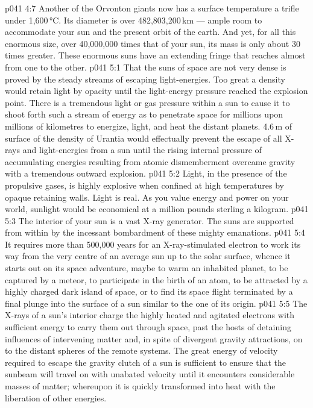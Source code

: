 \vs p041 4:7 Another of the Orvonton giants now has a surface temperature a trifle under 1,600\,°C. Its diameter is over 482,803,200\,km --- ample room to accommodate your sun and the present orbit of the earth. And yet, for all this enormous size, over 40,000,000 times that of your sun, its mass is only about 30 times greater. These enormous suns have an extending fringe that reaches almost from one to the other.
\vs p041 5:1 That the suns of space are not very dense is proved by the steady streams of escaping light\hyp{}energies. Too great a density would retain light by opacity until the light\hyp{}energy pressure reached the explosion point. There is a tremendous light or gas pressure within a sun to cause it to shoot forth such a stream of energy as to penetrate space for millions upon millions of kilometres to energize, light, and heat the distant planets. 4.6\,m of surface of the density of Urantia would effectually prevent the escape of all X\hyp{}rays and light\hyp{}energies from a sun until the rising internal pressure of accumulating energies resulting from atomic dismemberment overcame gravity with a tremendous outward explosion.
\vs p041 5:2 Light, in the presence of the propulsive gases, is highly explosive when confined at high temperatures by opaque retaining walls. Light is real. As you value energy and power on your world, sunlight would be economical at a million pounds sterling a kilogram.
\vs p041 5:3 The interior of your sun is a vast X\hyp{}ray generator. The suns are supported from within by the incessant bombardment of these mighty emanations.
\vs p041 5:4 It requires more than 500,000 years for an X\hyp{}ray\hyp{}stimulated electron to work its way from the very centre of an average sun up to the solar surface, whence it starts out on its space adventure, maybe to warm an inhabited planet, to be captured by a meteor, to participate in the birth of an atom, to be attracted by a highly charged dark island of space, or to find its space flight terminated by a final plunge into the surface of a sun similar to the one of its origin.
\vs p041 5:5 The X\hyp{}rays of a sun’s interior charge the highly heated and agitated electrons with sufficient energy to carry them out through space, past the hosts of detaining influences of intervening matter and, in spite of divergent gravity attractions, on to the distant spheres of the remote systems. The great energy of velocity required to escape the gravity clutch of a sun is sufficient to ensure that the sunbeam will travel on with unabated velocity until it encounters considerable masses of matter; whereupon it is quickly transformed into heat with the liberation of other energies.
